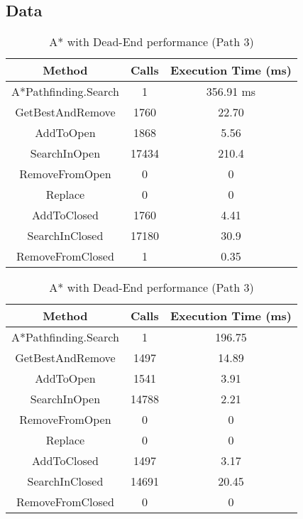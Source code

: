 \documentclass{article}
\begin{document}
  \subsection{Data}
  \begin{table}[h!]
    \parbox{.45\linewidth}{
      \centering
      \caption{A* with Dead-End performance (Path 2)}
      \label{tab:tableDeadEnd2}
      \begin{tabular}{c|c|c}
        \textbf{Method} & \textbf{Calls} & \textbf{Execution Time (ms)}\\
        \hline
        A*Pathfinding.Search  & 1 & 356.91 ms\\
        GetBestAndRemove & 1760 & 22.70\\
        AddToOpen & 1868 & 5.56\\
        SearchInOpen & 17434 & 210.4\\
        RemoveFromOpen & 0 & 0\\
        Replace & 0 & 0\\
        AddToClosed & 1760  & 4.41\\
        SearchInClosed & 17180 & 30.9\\
        RemoveFromClosed & 1 & 0.35\\
      \end{tabular}
    }
    \hfil
    \parbox{.45\linewidth}{
      \centering
      \caption{A* with Dead-End performance (Path 3)}
      \label{tab:tableDeadEnd3}
      \begin{tabular}{c|c|c}
        \textbf{Method} & \textbf{Calls} & \textbf{Execution Time (ms)}\\
        \hline
        A*Pathfinding.Search  & 1 & 196.75\\
        GetBestAndRemove & 1497 & 14.89\\
        AddToOpen & 1541 & 3.91\\
        SearchInOpen & 14788 & 2.21\\
        RemoveFromOpen & 0 & 0\\
        Replace & 0 & 0\\
        AddToClosed & 1497 & 3.17\\
        SearchInClosed & 14691 & 20.45\\
        RemoveFromClosed & 0 & 0\\
      \end{tabular}
    }
  \end{table}
\end{document}
